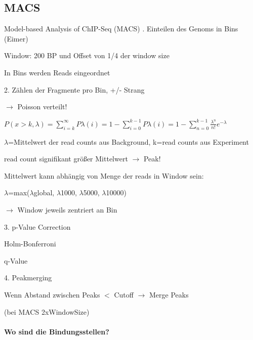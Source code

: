 \newpage
\subsection{MACS}
Model-based Analysis of ChIP-Seq (MACS)
\newline{}. Einteilen des Genoms in Bins (Eimer)

\hspace{10mm} Window: 200 BP und Offset von 1/4 der window size

\hspace{10mm} In Bins werden Reads eingeordnet

2. Zählen der Fragmente pro Bin, +/- Strang

\hspace{10mm}$\rightarrow$ Poisson verteilt!
\newline

\hspace{10mm}$P(x>k,\lambda)=\sum_{i=k}^{\infty}P\lambda(i)=1-\sum_{i=0}^{k-1}P\lambda(i)=1-\sum_{n=0}^{k-1}\frac{\lambda^{n}}{n!}e^{-\lambda}$

$\lambda$=Mittelwert der read counts aus Background, k=read counts aus Experiment

\hspace{10mm}read count signifikant größer Mittelwert $\rightarrow$ Peak!

\hspace{10mm}Mittelwert kann abhängig von Menge der reads in Window sein:

\hspace{15mm} $\lambda$=max($\lambda$global, $\lambda$1000, $\lambda$5000, $\lambda$10000)

\hspace{15mm} $\rightarrow$ Window jeweils zentriert an Bin

3. p-Value Correction

\hspace{10mm} Holm-Bonferroni

\hspace{10mm} q-Value

4. Peakmerging

\hspace{10mm} Wenn Abstand zwischen Peaks $<$ Cutoff $\rightarrow$ Merge Peaks

\hspace{15mm} (bei MACS 2xWindowSize)
\\\\
\textbf{Wo sind die Bindungsstellen?}

